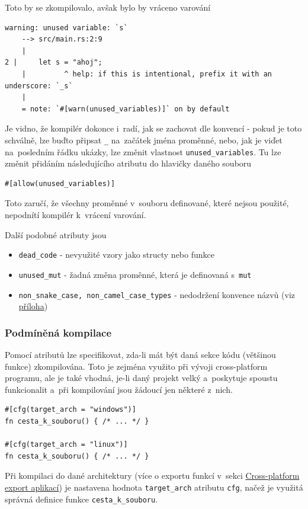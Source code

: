 \documentclass[a4paper, 12pt, twoside]{article} %
\newcommand{\rust}[1]{\texttt{#1}}
\begin{document}
			Toto by se zkompilovalo, avšak bylo by vráceno varování
			\begin{verbatim}
warning: unused variable: `s`
	--> src/main.rs:2:9
	|
2 |     let s = "ahoj";
	|         ^ help: if this is intentional, prefix it with an underscore: `_s`
	|
	= note: `#[warn(unused_variables)]` on by default
			\end{verbatim}
			
			Je vidno, že kompilér dokonce i~radí, jak se zachovat dle konvencí - pokud je toto schválně, lze buďto připsat \rust{_} na~začátek jména proměnné, nebo, jak je viďet na~posledním řádku ukázky, lze změnit vlastnost \rust{unused_variables}. Tu lze změnit přidáním následujícího atributu do hlavičky daného souboru
			\begin{verbatim}
#[allow(unused_variables)]
			\end{verbatim}
			
			Toto zaručí, že všechny proměnné v~souboru definované, které nejsou použité, nepodnítí kompilér k~vrácení varování.
			
			Další podobné atributy jsou
			\begin{itemize}
				\item \rust{dead_code} - nevyužité vzory jako structy nebo funkce
				\item \rust{unused_mut} - žadná změna proměnné, která je definovaná s~\rust{mut}
				\item \rust{non_snake_case, non_camel_case_types} - nedodržení konvence názvů (viz \hyperlink{konvence_nazvu}{příloha})
			\end{itemize}

		\subsubsection*{Podmíněná kompilace}
			Pomocí atributů lze specifikovat, zda-li mát být daná sekce kódu (většinou funkce) zkompilována. Toto je zejména využito při vývoji cross-platform programu, ale je také vhodná, je-li daný projekt velký a~poskytuje spoustu funkcionalit a~při kompilování jsou žádoucí jen některé z~nich.
			\begin{verbatim}
#[cfg(target_arch = "windows")]
fn cesta_k_souboru() { /* ... */ }

#[cfg(target_arch = "linux")]
fn cesta_k_souboru() { /* ... */ }
			\end{verbatim}
			
			Při kompilaci do dané architektury (více o exportu funkcí v~sekci \hyperlink{cross-platform}{Cross-platform export aplikací}) je nastavena hodnota \rust{target_arch} atributu \rust{cfg}, načež je využitá správná definice funkce \rust{cesta_k_souboru}.
			
\end{document}
